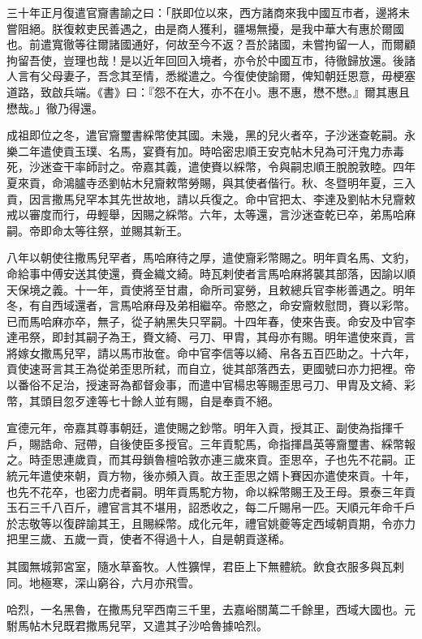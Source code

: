 \begin{pinyinscope}
三十年正月復遣官齎書諭之曰：「朕即位以來，西方諸商來我中國互市者，邊將未嘗阻絕。朕復敕吏民善遇之，由是商人獲利，疆埸無擾，是我中華大有惠於爾國也。前遣寬徹等往爾諸國通好，何故至今不返？吾於諸國，未嘗拘留一人，而爾顧拘留吾使，豈理也哉！是以近年回回入境者，亦令於中國互市，待徹歸放還。後諸人言有父母妻子，吾念其至情，悉縱遣之。今復使使諭爾，俾知朝廷恩意，毋梗塞道路，致啟兵端。《書》曰：『怨不在大，亦不在小。惠不惠，懋不懋。』爾其惠且懋哉。」徹乃得還。

成祖即位之冬，遣官齎璽書綵幣使其國。未幾，黑的兒火者卒，子沙迷查乾嗣。永樂二年遣使貢玉璞、名馬，宴賚有加。時哈密忠順王安克帖木兒為可汗鬼力赤毒死，沙迷查干率師討之。帝嘉其義，遣使賚以綵幣，令與嗣忠順王脫脫敦睦。四年夏來貢，命鴻臚寺丞劉帖木兒齎敕幣勞賜，與其使者偕行。秋、冬暨明年夏，三入貢，因言撒馬兒罕本其先世故地，請以兵復之。命中官把太、李達及劉帖木兒齎敕戒以審度而行，毋輕舉，因賜之綵幣。六年，太等還，言沙迷查乾已卒，弟馬哈麻嗣。帝即命太等往祭，並賜其新王。

八年以朝使往撒馬兒罕者，馬哈麻待之厚，遣使齎彩幣賜之。明年貢名馬、文豹，命給事中傅安送其使還，賚金織文綺。時瓦剌使者言馬哈麻將襲其部落，因諭以順天保境之義。十一年，貢使將至甘肅，命所司宴勞，且敕總兵官李彬善遇之。明年冬，有自西域還者，言馬哈麻母及弟相繼卒。帝愍之，命安齎敕慰問，賚以彩幣。已而馬哈麻亦卒，無子，從子納黑失只罕嗣。十四年春，使來告喪。命安及中官李達弔祭，即封其嗣子為王，賚文綺、弓刀、甲胄，其母亦有賜。明年遣使來貢，言將嫁女撒馬兒罕，請以馬市妝奩。命中官李信等以綺、帛各五百匹助之。十六年，貢使速哥言其王為從弟歪思所弒，而自立，徙其部落西去，更國號曰亦力把裡。帝以番俗不足治，授速哥為都督僉事，而遣中官楊忠等賜歪思弓刀、甲胄及文綺、彩幣，其頭目忽歹達等七十餘人並有賜，自是奉貢不絕。

宣德元年，帝嘉其尊事朝廷，遣使賜之鈔幣。明年入貢，授其正、副使為指揮千戶，賜誥命、冠帶，自後使臣多授官。三年貢駝馬，命指揮昌英等齎璽書、綵幣報之。時歪思連歲貢，而其母鎖魯檀哈敦亦連三歲來貢。歪思卒，子也先不花嗣。正統元年遣使來朝，貢方物，後亦頻入貢。故王歪思之婿卜賽因亦遣使來貢。十年，也先不花卒，也密力虎者嗣。明年貢馬駝方物，命以綵幣賜王及王母。景泰三年貢玉石三千八百斤，禮官言其不堪用，詔悉收之，每二斤賜帛一匹。天順元年命千戶於志敬等以復辟諭其王，且賜綵幣。成化元年，禮官姚夔等定西域朝貢期，令亦力把里三歲、五歲一貢，使者不得過十人，自是朝貢遂稀。

其國無城郭宮室，隨水草畜牧。人性獷悍，君臣上下無體統。飲食衣服多與瓦剌同。地極寒，深山窮谷，六月亦飛雪。

哈烈，一名黑魯，在撒馬兒罕西南三千里，去嘉峪關萬二千餘里，西域大國也。元駙馬帖木兒既君撒馬兒罕，又遣其子沙哈魯據哈烈。


\end{pinyinscope}

